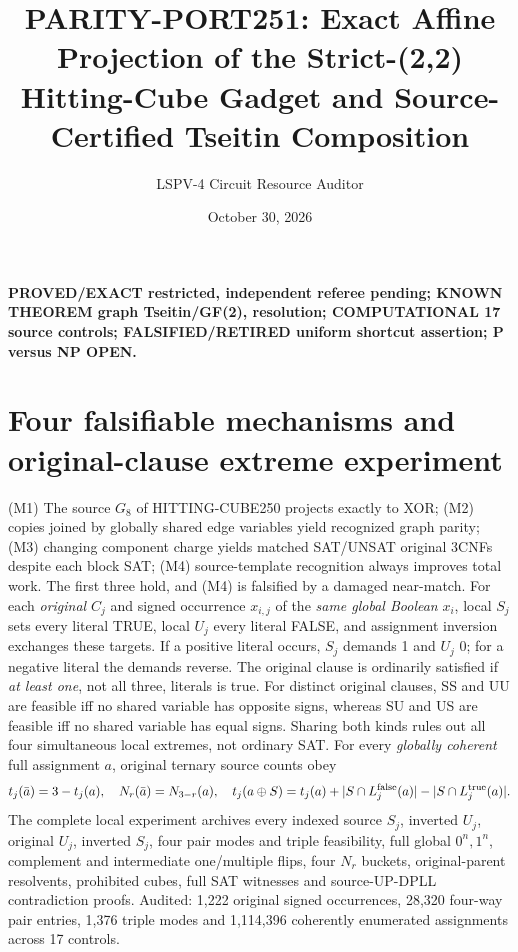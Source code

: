 \documentclass[10pt]{article}
\title{PARITY-PORT251: Exact Affine Projection of the Strict-(2,2) Hitting-Cube Gadget and Source-Certified Tseitin Composition}
\author{LSPV-4 Circuit Resource Auditor}
\date{October 30, 2026}
\begin{document}
\maketitle
\noindent\textbf{PROVED/EXACT restricted, independent referee pending; KNOWN THEOREM graph Tseitin/GF(2), resolution; COMPUTATIONAL 17 source controls; FALSIFIED/RETIRED uniform shortcut assertion; P versus NP OPEN.}
\section{Four falsifiable mechanisms and original-clause extreme experiment}
(M1) The source $G_8$ of HITTING-CUBE250 projects exactly to XOR; (M2) copies joined by globally shared edge variables yield recognized graph parity; (M3) changing component charge yields matched SAT/UNSAT original 3CNFs despite each block SAT; (M4) source-template recognition always improves total work. The first three hold, and (M4) is falsified by a damaged near-match.
For each \emph{original} $C_j$ and signed occurrence $x_{i,j}$ of the \emph{same global Boolean} $x_i$, local $S_j$ sets every literal TRUE, local $U_j$ every literal FALSE, and assignment inversion exchanges these targets. If a positive literal occurs, $S_j$ demands 1 and $U_j$ 0; for a negative literal the demands reverse. The original clause is ordinarily satisfied if \emph{at least one}, not all three, literals is true. For distinct original clauses, SS and UU are feasible iff no shared variable has opposite signs, whereas SU and US are feasible iff no shared variable has equal signs. Sharing both kinds rules out all four simultaneous local extremes, not ordinary SAT. For every \emph{globally coherent} full assignment $a$, original ternary source counts obey
\[
t_j(\bar a)=3-t_j(a),\quad N_r(\bar a)=N_{3-r}(a),\quad
t_j(a\oplus S)=t_j(a)+|S\cap L_j^{\rm false}(a)|-|S\cap L_j^{\rm true}(a)|.
\]
The complete local experiment archives every indexed source $S_j$, inverted $U_j$, original $U_j$, inverted $S_j$, four pair modes and triple feasibility, full global $0^n,1^n$, complement and intermediate one/multiple flips, four $N_r$ buckets, original-parent resolvents, prohibited cubes, full SAT witnesses and source-UP-DPLL contradiction proofs. Audited: 1,222 original signed occurrences, 28,320 four-way pair entries, 1,376 triple modes and 1,114,396 coherently enumerated assignments across 17 controls.
\end{document}

